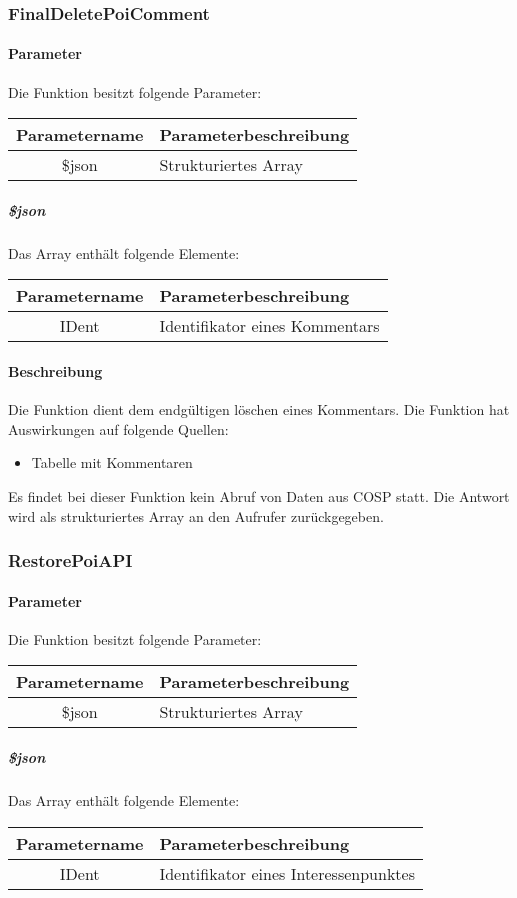 \subsubsection{FinalDeletePoiComment}
\paragraph{Parameter} Die Funktion besitzt folgende Parameter:
\begin{table}[H]
	\begin{tabular}{|c|p{11cm}|}
		\hline
		\textbf{Parametername} & \textbf{Parameterbeschreibung} \\ \hline
		\$json & Strukturiertes Array \\ \hline
	\end{tabular}
\end{table}
\subparagraph{\$json}Das Array enthält folgende Elemente:
\begin{table}[H]
	\begin{tabular}{|c|p{11cm}|}
		\hline
		\textbf{Parametername} & \textbf{Parameterbeschreibung} \\ \hline
		IDent & Identifikator eines Kommentars \\ \hline
	\end{tabular}
\end{table}
\paragraph{Beschreibung} Die Funktion dient dem endgültigen löschen eines Kommentars. Die Funktion hat Auswirkungen auf folgende Quellen:
\begin{itemize}
	\item Tabelle mit Kommentaren
\end{itemize}
Es findet bei dieser Funktion kein Abruf von Daten aus {\glqq COSP\grqq} statt. Die Antwort wird als strukturiertes Array an den Aufrufer zurückgegeben.
\subsubsection{RestorePoiAPI}
\paragraph{Parameter} Die Funktion besitzt folgende Parameter:
\begin{table}[H]
	\begin{tabular}{|c|p{11cm}|}
		\hline
		\textbf{Parametername} & \textbf{Parameterbeschreibung} \\ \hline
		\$json & Strukturiertes Array \\ \hline
	\end{tabular}
\end{table}
\subparagraph{\$json}Das Array enthält folgende Elemente:
\begin{table}[H]
	\begin{tabular}{|c|p{11cm}|}
		\hline
		\textbf{Parametername} & \textbf{Parameterbeschreibung} \\ \hline
		IDent & Identifikator eines Interessenpunktes \\ \hline
	\end{tabular}
\end{table}
